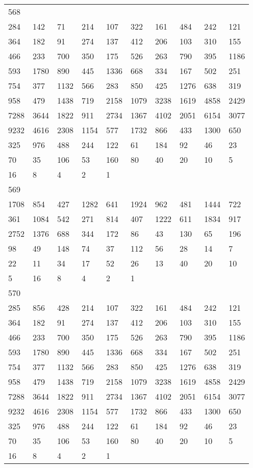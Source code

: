 \begin{longtable}{*{10}{l}}
568&&&&&&&&&\\
284& 142& 71& 214& 107& 322& 161& 484& 242& 121\\
364& 182& 91& 274& 137& 412& 206& 103& 310& 155\\
466& 233& 700& 350& 175& 526& 263& 790& 395& 1186\\
593& 1780& 890& 445& 1336& 668& 334& 167& 502& 251\\
754& 377& 1132& 566& 283& 850& 425& 1276& 638& 319\\
958& 479& 1438& 719& 2158& 1079& 3238& 1619& 4858& 2429\\
7288& 3644& 1822& 911& 2734& 1367& 4102& 2051& 6154& 3077\\
9232& 4616& 2308& 1154& 577& 1732& 866& 433& 1300& 650\\
325& 976& 488& 244& 122& 61& 184& 92& 46& 23\\
70& 35& 106& 53& 160& 80& 40& 20& 10& 5\\
16& 8& 4& 2& 1& \\

569&&&&&&&&&\\
1708& 854& 427& 1282& 641& 1924& 962& 481& 1444& 722\\
361& 1084& 542& 271& 814& 407& 1222& 611& 1834& 917\\
2752& 1376& 688& 344& 172& 86& 43& 130& 65& 196\\
98& 49& 148& 74& 37& 112& 56& 28& 14& 7\\
22& 11& 34& 17& 52& 26& 13& 40& 20& 10\\
5& 16& 8& 4& 2& 1& \\

570&&&&&&&&&\\
285& 856& 428& 214& 107& 322& 161& 484& 242& 121\\
364& 182& 91& 274& 137& 412& 206& 103& 310& 155\\
466& 233& 700& 350& 175& 526& 263& 790& 395& 1186\\
593& 1780& 890& 445& 1336& 668& 334& 167& 502& 251\\
754& 377& 1132& 566& 283& 850& 425& 1276& 638& 319\\
958& 479& 1438& 719& 2158& 1079& 3238& 1619& 4858& 2429\\
7288& 3644& 1822& 911& 2734& 1367& 4102& 2051& 6154& 3077\\
9232& 4616& 2308& 1154& 577& 1732& 866& 433& 1300& 650\\
325& 976& 488& 244& 122& 61& 184& 92& 46& 23\\
70& 35& 106& 53& 160& 80& 40& 20& 10& 5\\
16& 8& 4& 2& 1& \\


\end{longtable}
